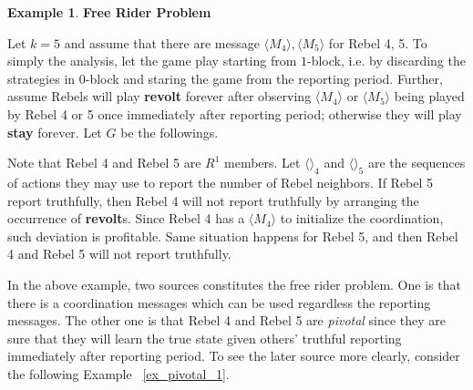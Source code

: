 \documentclass[12pt,letter]{article}
\theoremstyle{definition}
\newtheorem{example}{Example}[section]
\theoremstyle{remark}
\theoremstyle{claim}
\begin{document}
\begin{example} \label{ex_free_rider_tree}\textbf{Free Rider Problem}

Let $k=5$ and assume that there are message $\langle M_4 \rangle,\langle M_5 \rangle$ for Rebel 4, 5. To simply the analysis, let the game play starting from $1$-block, i.e. by discarding the strategies in $0$-block and staring the game from the reporting period. Further, assume Rebels will play \textbf{revolt} forever after observing $\langle M_4 \rangle$ or $\langle M_5 \rangle$ being played by Rebel 4 or 5 once immediately after reporting period; otherwise they will play \textbf{stay} forever. Let $G$ be the followings.

\begin{center}
\end{center}

Note that Rebel 4 and Rebel 5 are $R^1$ members. Let $\langle \rangle_4$ and $\langle \rangle_5$ are the sequences of actions they may use to report the number of Rebel neighbors. If Rebel 5 report truthfully, then Rebel 4 will not report truthfully by arranging the occurrence of \textbf{revolt}s. Since Rebel 4 has a $\langle M_4 \rangle$ to initialize the coordination, such deviation is profitable. Same situation happens for Rebel 5, and then Rebel 4 and Rebel 5 will not report truthfully.

\end{example}

In the above example, two sources constitutes the free rider problem. One is that there is a coordination messages which can be used regardless the reporting messages. The other one is that Rebel 4 and Rebel 5 are \textit{pivotal} since they are sure that they will learn the true state given others' truthful reporting immediately after reporting period. To see the later source more clearly, consider the following Example ~\ref{ex_pivotal_1}.
\end{document}
